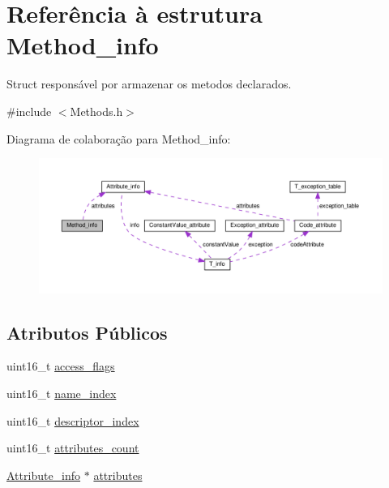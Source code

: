 \hypertarget{structMethod__info}{}\section{Referência à estrutura Method\+\_\+info}
\label{structMethod__info}


Struct responsável por armazenar os metodos declarados.  




{\ttfamily \#include $<$Methods.\+h$>$}



Diagrama de colaboração para Method\+\_\+info\+:\nopagebreak
\begin{figure}[H]
\begin{center}
\leavevmode
\includegraphics[width=350pt]{structMethod__info__coll__graph}
\end{center}
\end{figure}
\subsection*{Atributos Públicos}
\begin{DoxyCompactItemize}
\item 
uint16\+\_\+t \hyperlink{structMethod__info_a6d6c8c25f4bdb42b77b6a8ac6250398b}{access\+\_\+flags}
\item 
uint16\+\_\+t \hyperlink{structMethod__info_ad1f067bfd8d2d231f598824676dc7851}{name\+\_\+index}
\item 
uint16\+\_\+t \hyperlink{structMethod__info_af713175c97f681296e801e0c11e0ae34}{descriptor\+\_\+index}
\item 
uint16\+\_\+t \hyperlink{structMethod__info_afd638bcc6f20cfa8dd1de8741c8b5493}{attributes\+\_\+count}
\item 
\hyperlink{structAttribute__info}{Attribute\+\_\+info} $\ast$ \hyperlink{structMethod__info_a56fbb565dcff2992d66f57b29774c322}{attributes}
\end{DoxyCompactItemize}


